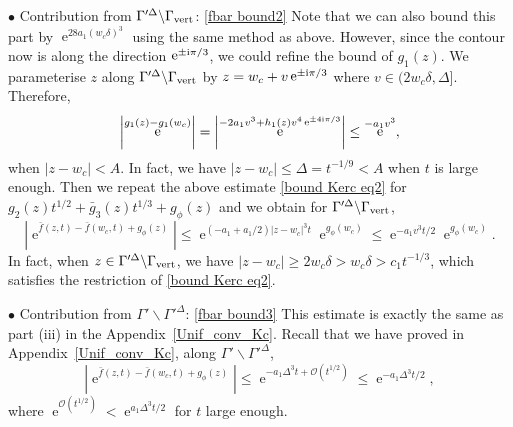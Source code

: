 \documentclass[cmp]{svjour}
\numberwithin{theorem}{section}
\numberwithin{equation}{section}
\DeclareMathOperator{\e}{e}
\def\ii{{\rm i}}
\begin{document}
$\bullet$ Contribution from $\Gamma'^{\Delta} \backslash \Gamma_{\rm vert}$: \eqref{fbar bound2} \newline Note that we can also bound this part by $\e^{28 a_1 (w_c \delta)^3}$ using the same method as above. However, since the contour now is along the direction $\e^{\pm \ii \pi /3}$, we could refine the bound of $g_1(z)$. We parameterise $z$ along $\Gamma'^{\Delta} \backslash \Gamma_{\rm vert}$ by $z=w_c + v \e^{\pm \ii \pi /3}$ where $v \in (2 w_c \delta , \Delta]$. Therefore, 
\begin{equation*}
	\left|  \e^{g_1(z) - g_1(w_c)} \right|= \left|\e^{-2a_1 v^3 + h_1(z) v^4 \e^{\pm 4 \ii \pi /3}}\right| \leq \e^{-a_1 v^3},
\end{equation*}
when $|z-w_c| < A$. In fact, we have $|z-w_c| \leq \Delta = t^{-1/9} < A$ when $t$ is large enough. Then we repeat the above estimate \eqref{bound Kerc eq2} for $g_2(z) t^{1/2} + \bar{g}_3(z) t^{1/3} + g_{\phi}(z) $ and we obtain for $\Gamma'^{\Delta} \backslash \Gamma_{\rm vert}$, 
\begin{equation}\label{fbar bound2}
	\left|	\e^{\bar{f}(z,t) - \bar{f}(w_c, t) + g_{\phi}(z) }  \right| \leq \e^{(-a_1 +a_1/2)|z-w_c|^3 t} \e^{g_{\phi}(w_c)} \leq \e^{-a_1 v^3 t /2} \e^{g_{\phi}(w_c)}.
\end{equation}
In fact, when $z \in \Gamma'^{\Delta} \backslash \Gamma_{\rm vert}$, we have $|z-w_c| \geq 2 w_c \delta > w_c \delta > c_1 t^{-1/3}$, which satisfies the restriction of \eqref{bound Kerc eq2}. 



$\bullet$ Contribution from $\Gamma' \backslash \Gamma'^{\Delta}$: \eqref{fbar bound3} \newline This estimate is exactly the same as part (iii) in the Appendix~\ref{Unif_conv_Kc}. Recall that we have proved in Appendix~\ref{Unif_conv_Kc}, along  $\Gamma' \backslash \Gamma'^{\Delta}$, 
\begin{equation}\label{fbar bound3}
	\left| \e^{\bar{f}(z,t) - \bar{f}(w_c,t) + g_{\phi}(z)}  \right| \leq \e^{- a_1 \Delta^3 t + \mathcal{O}(t^{1/2})} \leq \e^{- a_1 \Delta^3 t /2},
\end{equation} 
where $\e^{\mathcal{O}(t^{1/2})} < \e^{ a_1 \Delta^3 t /2}$ for $t$ large enough.
\end{document}
